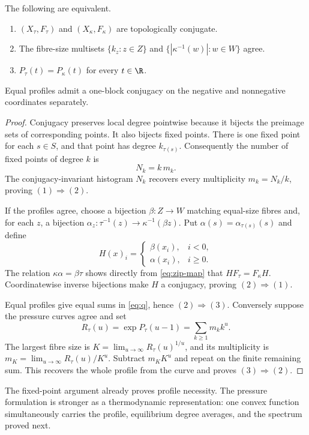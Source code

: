 \begin{theorem}\label{thm:rigidity}
The following are equivalent.
\begin{enumerate}
\item $(X_\tau,F_\tau)$ and $(X_\kappa,F_\kappa)$ are topologically
conjugate.
\item The fibre-size multisets $\{k_z:z\in Z\}$ and
$\{|\kappa^{-1}(w)|:w\in W\}$ agree.
\item $P_\tau(t)=P_\kappa(t)$ for every $t\in\R$.
\end{enumerate}
Equal profiles admit a one-block conjugacy on the negative and nonnegative
coordinates separately.
\end{theorem}

\begin{proof}
Conjugacy preserves local degree pointwise because it bijects the preimage
sets of corresponding points.  It also bijects fixed points.  There is one
fixed point for each $s\in S$, and that point has degree $k_{\tau(s)}$.
Consequently the number of fixed points of degree $k$ is
\[
 N_k=k\,m_k.
 \tag{4.4}\label{eq:degree-hist}
\]
The conjugacy-invariant histogram $N_k$ recovers every multiplicity
$m_k=N_k/k$, proving $(1)\Rightarrow(2)$.

If the profiles agree, choose a bijection $\beta:Z\to W$ matching equal-size
fibres and, for each $z$, a bijection
$\alpha_z:\tau^{-1}(z)\to\kappa^{-1}(\beta z)$.  Put
$\alpha(s)=\alpha_{\tau(s)}(s)$ and define
\[
 H(x)_i=
 \begin{cases}
 \beta(x_i),&i<0,\\
 \alpha(x_i),&i\geq0.
 \end{cases}
 \tag{4.5}\label{eq:one-block-conj}
\]
The relation $\kappa\alpha=\beta\tau$ shows directly from
\eqref{eq:zip-map} that $HF_\tau=F_\kappa H$.  Coordinatewise inverse
bijections make $H$ a conjugacy, proving $(2)\Rightarrow(1)$.

Equal profiles give equal sums in \eqref{eq:q}, hence $(2)\Rightarrow(3)$.
Conversely suppose the pressure curves agree and set
\[
 R_\tau(u)=\exp P_\tau(u-1)=\sum_{k\geq1}m_k k^u.
 \tag{4.6}\label{eq:dirichlet}
\]
The largest fibre size is
$K=\lim_{u\to\infty}R_\tau(u)^{1/u}$, and its multiplicity is
$m_K=\lim_{u\to\infty}R_\tau(u)/K^u$.  Subtract $m_KK^u$ and repeat on the
finite remaining sum.  This recovers the whole profile from the curve and
proves $(3)\Rightarrow(2)$.
\end{proof}

The fixed-point argument already proves profile necessity.  The pressure
formulation is stronger as a thermodynamic representation: one convex
function simultaneously carries the profile, equilibrium degree averages,
and the spectrum proved next.
